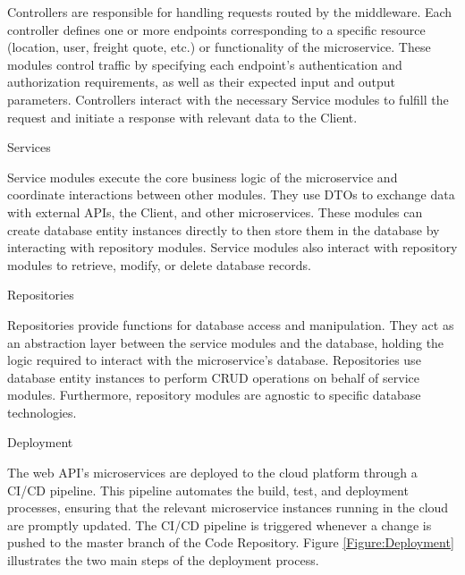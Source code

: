 \documentclass[12pt, reqno]{amsbook}
\makeatletter
\def\section{\@startsection{section}{1}%
      \z@{.5\linespacing\@plus.7\linespacing}{.25\linespacing}%
      {\normalfont\bfseries\flushleft}}
\def\subsection{\@startsection{subsection}{2}%
      \z@{.5\linespacing\@plus.7\linespacing}{.25\linespacing}%
      {\normalfont\bfseries\flushleft}}
\theoremstyle{definition}
\theoremstyle{definition}
\numberwithin{section}{chapter}
\numberwithin{table}{chapter}
\numberwithin{figure}{chapter}
\makeatother
\begin{document}
Controllers are responsible for handling requests routed by the middleware. Each controller defines one or more endpoints corresponding to a specific resource (location, user, freight quote, etc.) or functionality of the microservice. These modules control traffic by specifying each endpoint's authentication and authorization requirements, as well as their expected input and output parameters. Controllers interact with the necessary Service modules to fulfill the request and initiate a response with relevant data to the Client.

\subsection{Services}

Service modules execute the core business logic of the microservice and coordinate interactions between other modules. They use \acp{DTO} to exchange data with external \acp{API}, the Client, and other microservices. These modules can create database entity instances directly to then store them in the database by interacting with repository modules. Service modules also interact with repository modules to retrieve, modify, or delete database records.

\subsection{Repositories}

Repositories provide functions for database access and manipulation. They act as an abstraction layer between the service modules and the database, holding the logic required to interact with the microservice's database. Repositories use database entity instances to perform \ac{CRUD} operations on behalf of service modules. Furthermore, repository modules are agnostic to specific database technologies.

\section{Deployment}
\label{Section:Deployment}

The web \ac{API}'s microservices are deployed to the cloud platform through a \ac{CI/CD} pipeline. This pipeline automates the build, test, and deployment processes, ensuring that the relevant microservice instances running in the cloud are promptly updated. The \ac{CI/CD} pipeline is triggered whenever a change is pushed to the master branch of the Code Repository. Figure \ref{Figure:Deployment} illustrates the two main steps of the deployment process.
\end{document}

